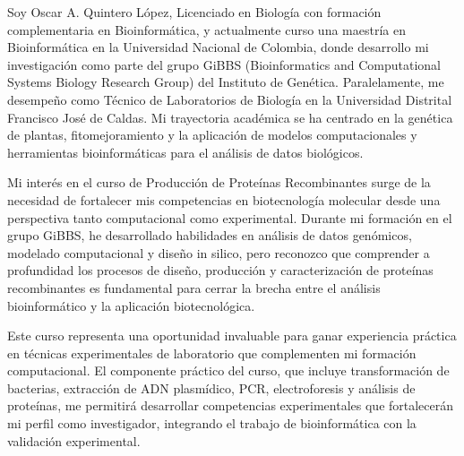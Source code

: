 \documentclass[11pt, letterpaper]{awesome-cv} %
\begin{document}
\makecvheader %

\makelettertitle %


\begin{cvletter}



Soy Oscar A. Quintero López, Licenciado en Biología con formación complementaria en Bioinformática, y actualmente curso una maestría en Bioinformática en la Universidad Nacional de Colombia, donde desarrollo mi investigación como parte del grupo GiBBS (Bioinformatics and Computational Systems Biology Research Group) del Instituto de Genética. Paralelamente, me desempeño como Técnico de Laboratorios de Biología en la Universidad Distrital Francisco José de Caldas. Mi trayectoria académica se ha centrado en la genética de plantas, fitomejoramiento y la aplicación de modelos computacionales y herramientas bioinformáticas para el análisis de datos biológicos.



Mi interés en el curso de Producción de Proteínas Recombinantes surge de la necesidad de fortalecer mis competencias en biotecnología molecular desde una perspectiva tanto computacional como experimental. Durante mi formación en el grupo GiBBS, he desarrollado habilidades en análisis de datos genómicos, modelado computacional y diseño in silico, pero reconozco que comprender a profundidad los procesos de diseño, producción y caracterización de proteínas recombinantes es fundamental para cerrar la brecha entre el análisis bioinformático y la aplicación biotecnológica.

Este curso representa una oportunidad invaluable para ganar experiencia práctica en técnicas experimentales de laboratorio que complementen mi formación computacional. El componente práctico del curso, que incluye transformación de bacterias, extracción de ADN plasmídico, PCR, electroforesis y análisis de proteínas, me permitirá desarrollar competencias experimentales que fortalecerán mi perfil como investigador, integrando el trabajo de bioinformática con la validación experimental.


\end{cvletter}
\end{document}
